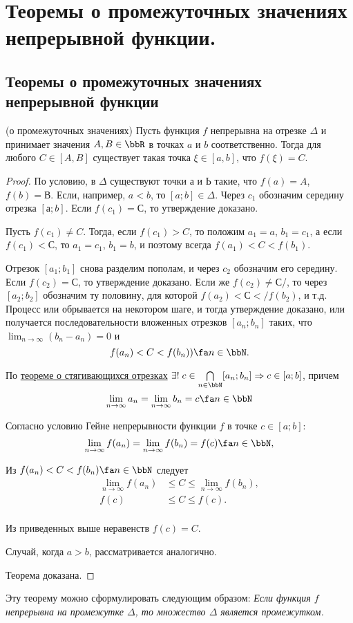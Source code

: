 \chapter{Теоремы о промежуточных значениях непрерывной функции.}
\section{Теоремы о промежуточных значениях непрерывной функции}

\begin{thm} (о промежуточных значениях) \label{ch3n2}
Пусть функция $f$ непрерывна на отрезке $\Delta$ и принимает значения $A,B \in \bbR$ в точках $a$ и $b$ соответственно. Тогда для любого $C\in[A,B]$ существует такая точка $\xi \in [a,b]$, что $f(\xi)=C$.
\end{thm}
\begin{proof}
По условию, в $\Delta$ существуют точки $а$ и $Ь$ такие, что $f(a) = A$, $f(b) = В$. Если, например, $a < b$, то $[a; b]\in \Delta$.
Через $c_1$ обозначим середину отрезка $[а;b]$. Если $f(c_1) = С$, то утверждение доказано.

Пусть $f(c_1)\ne C$. Тогда, если $f(c_1) > C$, то положим $a_1 = a$, $b_1 = c_1$, а если $f(c_1) < С$, то $a_1 = c_1$, $b_1 = b$, и поэтому всегда $f(a_1)<C<f(b_1)$.

Отрезок $[a_1; b_1]$ снова разделим пополам, и через $c_2$ обозначим его середину. Если $f(c_2) = С$, то утверждение доказано. Если же $f(c_2) \ne С$/, то через $[a_2;b_2]$ обозначим ту половину, для которой $f(a_2) < С < /f(b_2)$, и т.д. Процесс или обрывается на некотором шаге, и тогда утверждение доказано, или получается последовательности вложенных отрезков $[a_n;b_n]$ таких, что $\lim_{n \to \infty}\limits(b_n-a_n)=0$ и
$$
f(a_n)<C<f(b_n)) \fa n\in \bbN.
$$

По \hyperref[exp3]{теореме о стягивающихся отрезках} $\exists!\; c \in \bigcap_{n \in \bbN}\limits[a_n;b_n] \Rightarrow c\in [a;b]$, причем 
$$
\lim_{n \to \infty}a_n = \lim_{n \to \infty}b_n = c \fa n \in \bbN
$$

Согласно условию Гейне непрерывности функции $f$ в точке $c\in[a;b]$:
$$
\lim_{n \to \infty}f(a_n) = \lim_{n \to \infty}f(b_n) = f(c) \fa n \in \bbN,
$$

Из $f(a_n)<C<f(b_n) \fa n\in\bbN$ следует 
\begin{equation*}
\begin{split}
\lim_{n \to \infty}f(a_n) &\le C \le \lim_{n \to \infty}f(b_n),\\
f(c)&\le C\le f(c).\\
\end{split}
\end{equation*}

Из приведенных выше неравенств $f(c)=C$.

Случай, когда $a > b$, рассматривается аналогично. 

\noindent 
Теорема доказана.
\end{proof}
Эту теорему можно сформулировать следующим образом:	\textit{Если функция
$f$ непрерывна на промежутке $\Delta$, то множество $\Delta$ является промежутком.}

